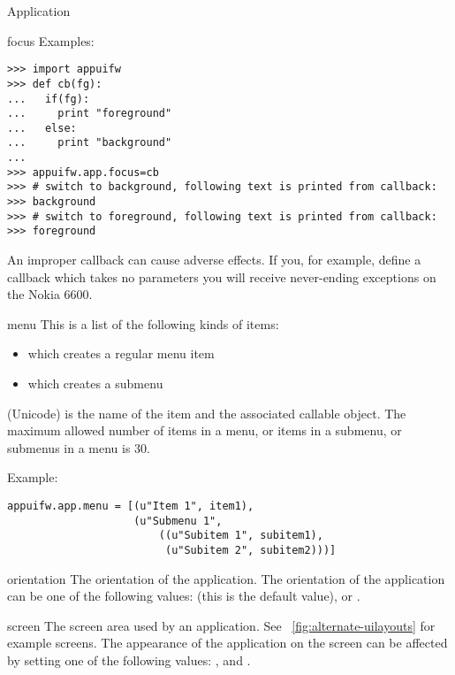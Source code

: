 \begin{classdesc*}{Application}
\begin{memberdesc}[Application]{focus}
Examples:
\begin{verbatim}
>>> import appuifw
>>> def cb(fg):
...   if(fg):
...     print "foreground"
...   else:
...     print "background"
...
>>> appuifw.app.focus=cb
>>> # switch to background, following text is printed from callback:
>>> background
>>> # switch to foreground, following text is printed from callback:
>>> foreground
\end{verbatim}

\begin{notice}
An improper callback can cause adverse effects. If you, for example,
define a callback which takes no parameters you will receive
never-ending  exceptions on the Nokia 6600.
\end{notice}

\end{memberdesc}

\begin{memberdesc}[Application]{menu}
This is a list of the following kinds of items:
\begin{itemize}
\item {} which creates a regular menu item
\item {} which creates a submenu
\end{itemize}

 (Unicode) is the name of the item and  the associated callable object. 
The maximum allowed number of items in a menu, or items in a submenu,
or submenus in a menu is 30.

Example:
\begin{verbatim}
appuifw.app.menu = [(u"Item 1", item1),
                    (u"Submenu 1", 
                        ((u"Subitem 1", subitem1),
                         (u"Subitem 2", subitem2)))]
\end{verbatim}
\end{memberdesc}

\begin{memberdesc}[Application]{orientation}
The orientation of the application. The orientation of the application can be 
one of the following values:  (this is the default value), 
 or .
\end{memberdesc}

\begin{memberdesc}[Application]{screen}
The screen area used by an application. See \figurename~\ref{fig:alternate-uilayouts} for
example screens. The appearance of the application on the screen can
be affected by setting one of the following values: ,
 and .


\end{memberdesc}
\end{classdesc*}
